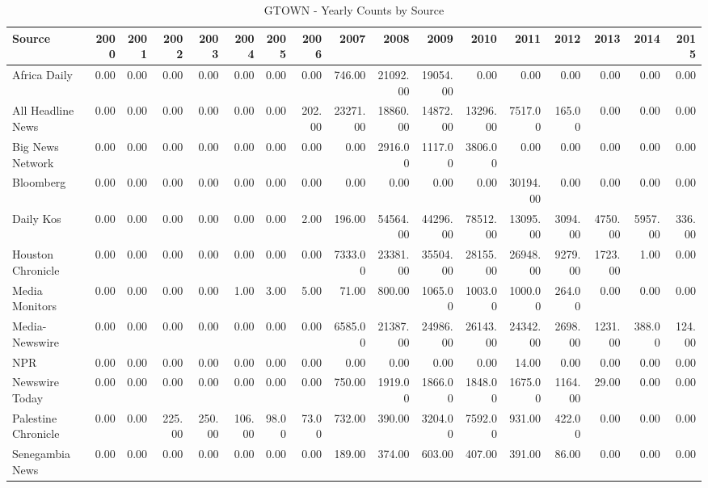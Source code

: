 \begin{table}[ht]
\centering
\caption{GTOWN - Yearly Counts by Source} 
\label{tab:gtown_yearly_counts}
\begin{tabular}{lrrrrrrrrrrrrrrrr}
  \hline
Source & 2000 & 2001 & 2002 & 2003 & 2004 & 2005 & 2006 & 2007 & 2008 & 2009 & 2010 & 2011 & 2012 & 2013 & 2014 & 2015 \\ 
  \hline
Africa Daily & 0.00 & 0.00 & 0.00 & 0.00 & 0.00 & 0.00 & 0.00 & 746.00 & 21092.00 & 19054.00 & 0.00 & 0.00 & 0.00 & 0.00 & 0.00 & 0.00 \\ 
  All Headline News & 0.00 & 0.00 & 0.00 & 0.00 & 0.00 & 0.00 & 202.00 & 23271.00 & 18860.00 & 14872.00 & 13296.00 & 7517.00 & 165.00 & 0.00 & 0.00 & 0.00 \\ 
  Big News Network & 0.00 & 0.00 & 0.00 & 0.00 & 0.00 & 0.00 & 0.00 & 0.00 & 2916.00 & 1117.00 & 3806.00 & 0.00 & 0.00 & 0.00 & 0.00 & 0.00 \\ 
  Bloomberg & 0.00 & 0.00 & 0.00 & 0.00 & 0.00 & 0.00 & 0.00 & 0.00 & 0.00 & 0.00 & 0.00 & 30194.00 & 0.00 & 0.00 & 0.00 & 0.00 \\ 
  Daily Kos & 0.00 & 0.00 & 0.00 & 0.00 & 0.00 & 0.00 & 2.00 & 196.00 & 54564.00 & 44296.00 & 78512.00 & 13095.00 & 3094.00 & 4750.00 & 5957.00 & 336.00 \\ 
  Houston Chronicle & 0.00 & 0.00 & 0.00 & 0.00 & 0.00 & 0.00 & 0.00 & 7333.00 & 23381.00 & 35504.00 & 28155.00 & 26948.00 & 9279.00 & 1723.00 & 1.00 & 0.00 \\ 
  Media Monitors & 0.00 & 0.00 & 0.00 & 0.00 & 1.00 & 3.00 & 5.00 & 71.00 & 800.00 & 1065.00 & 1003.00 & 1000.00 & 264.00 & 0.00 & 0.00 & 0.00 \\ 
  Media-Newswire & 0.00 & 0.00 & 0.00 & 0.00 & 0.00 & 0.00 & 0.00 & 6585.00 & 21387.00 & 24986.00 & 26143.00 & 24342.00 & 2698.00 & 1231.00 & 388.00 & 124.00 \\ 
  NPR & 0.00 & 0.00 & 0.00 & 0.00 & 0.00 & 0.00 & 0.00 & 0.00 & 0.00 & 0.00 & 0.00 & 14.00 & 0.00 & 0.00 & 0.00 & 0.00 \\ 
  Newswire Today & 0.00 & 0.00 & 0.00 & 0.00 & 0.00 & 0.00 & 0.00 & 750.00 & 1919.00 & 1866.00 & 1848.00 & 1675.00 & 1164.00 & 29.00 & 0.00 & 0.00 \\ 
  Palestine Chronicle & 0.00 & 0.00 & 225.00 & 250.00 & 106.00 & 98.00 & 73.00 & 732.00 & 390.00 & 3204.00 & 7592.00 & 931.00 & 422.00 & 0.00 & 0.00 & 0.00 \\ 
  Senegambia News & 0.00 & 0.00 & 0.00 & 0.00 & 0.00 & 0.00 & 0.00 & 189.00 & 374.00 & 603.00 & 407.00 & 391.00 & 86.00 & 0.00 & 0.00 & 0.00 \\ 

\end{tabular}
\end{table}

